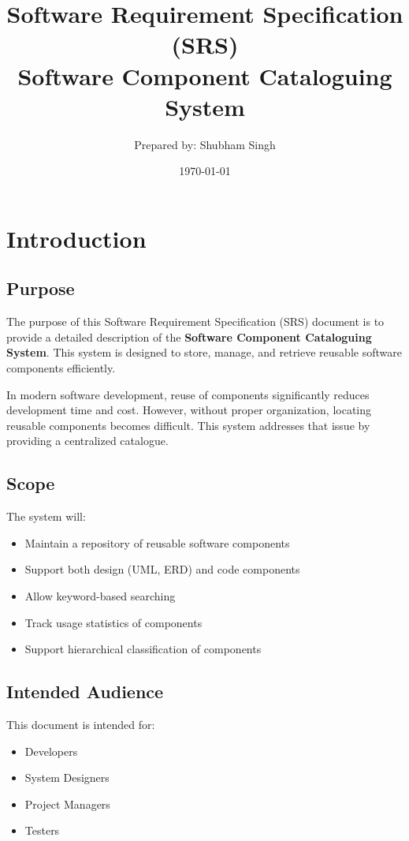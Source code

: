 \documentclass[12pt]{scrreprt}
\title{\textbf{Software Requirement Specification (SRS)}\\
\large Software Component Cataloguing System}
\author{Prepared by: Shubham Singh}
\date{\today}
\begin{document}
\maketitle
\tableofcontents
\newpage

\chapter{Introduction}

\section{Purpose}
The purpose of this Software Requirement Specification (SRS) document is to provide a detailed description of the \textbf{Software Component Cataloguing System}. This system is designed to store, manage, and retrieve reusable software components efficiently.

In modern software development, reuse of components significantly reduces development time and cost. However, without proper organization, locating reusable components becomes difficult. This system addresses that issue by providing a centralized catalogue.

\section{Scope}
The system will:
\begin{itemize}
    \item Maintain a repository of reusable software components
    \item Support both design (UML, ERD) and code components
    \item Allow keyword-based searching
    \item Track usage statistics of components
    \item Support hierarchical classification of components
\end{itemize}

\section{Intended Audience}
This document is intended for:
\begin{itemize}
    \item Developers
    \item System Designers
    \item Project Managers
    \item Testers
\end{itemize}
\end{document}
